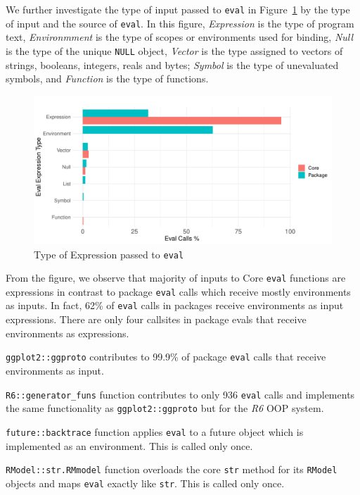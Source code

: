 \documentclass[USenglish,cleveref, autoref, thm-restate]{lipics-v2019}
\newcommand{\PackageEnvironmentInputEvalCallPerc}{62\%\xspace}
\newcommand{\eval}{\texttt{eval}\xspace}
\renewcommand{\c}[1]{\lstinline{#1}\xspace}
\begin{document}
We further investigate the type of input passed to \eval in
Figure~\ref{fig:eval-expression-kind} by the type of input and the source of
\eval. In this figure, \emph{Expression} is the type of program text,
\emph{Environmment} is the type of scopes or environments used for binding,
\emph{Null} is the type of the unique \c{NULL} object, \emph{Vector} is the
type assigned to vectors of strings, booleans, integers, reals and bytes;
\emph{Symbol} is the type of unevaluated symbols, and \emph{Function} is the
type of functions.

\begin{figure}[!h]
  \centering
  \includegraphics[width=\columnwidth]{eval-expression-kind}
  \caption{Type of Expression passed to \eval} \label{fig:eval-expression-kind}
\end{figure}

From the figure, we observe that majority of inputs to Core \eval functions
are expressions in contrast to package \eval calls which receive mostly
environments as inputs. In fact, \PackageEnvironmentInputEvalCallPerc of
\eval calls in packages receive environments as input expressions. There are
only four callsites in package evals that receive environments as
expressions.
\begin{compactitem}[$-$]
\item \c{ggplot2::ggproto} contributes to 99.9\% of package \eval calls that
  receive environments as input.
\item \c{R6::generator_funs} function contributes to only 936 \eval calls and
implements the same functionality as \c{ggplot2::ggproto} but for the \emph{R6}
OOP system.
\item \c{future::backtrace} function applies \eval to a future object which
  is implemented as an environment. This is called only once.
\item \c{RModel::str.RMmodel} function overloads the core \c{str} method for its
\c{RModel} objects and maps \eval exactly like \c{str}. This is called only
once.
\end{compactitem}
\end{document}
